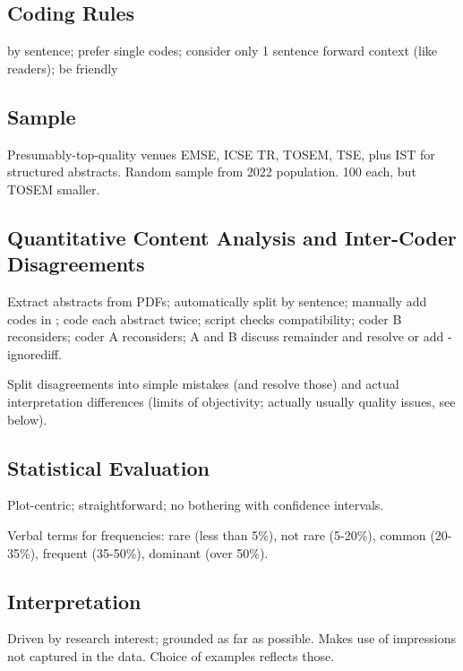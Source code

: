 \documentclass[10pt,journal,compsoc]{IEEEtran}
\begin{document}
\subsection{Coding Rules}

\noindent
by sentence; prefer single codes; consider only 1 sentence forward context (like readers); be friendly


\subsection{Sample}

\noindent
Presumably-top-quality venues EMSE, ICSE TR, TOSEM, TSE,
plus IST for structured abstracts.
Random sample from 2022 population.
100 each, but TOSEM smaller.


\subsection{Quantitative Content Analysis and Inter-Coder Disagreements}

\noindent
Extract abstracts from PDFs; automatically split by sentence; manually add codes in {{}};
code each abstract twice; script checks compatibility; coder B reconsiders; coder A reconsiders;
A and B discuss remainder and resolve or add -ignorediff.

Split disagreements into simple mistakes (and resolve those) and actual interpretation differences
(limits of objectivity; actually usually quality issues, see below).


\subsection{Statistical Evaluation}

\noindent
Plot-centric; straightforward; no bothering with confidence intervals.

Verbal terms for frequencies: 
rare (less than 5\%),
not rare (5-20\%),
common (20-35\%),
frequent (35-50\%),
dominant (over 50\%).


\subsection{Interpretation}

\noindent
Driven by research interest; grounded as far as possible.
Makes use of impressions not captured in the data.
Choice of examples reflects those.


\end{document}
